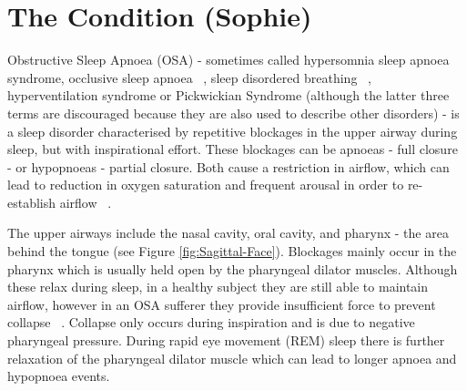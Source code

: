 \chapter{The Condition (Sophie)}
\label{ch:medicalInfo}
Obstructive Sleep Apnoea (OSA) - sometimes called hypersomnia sleep apnoea syndrome, occlusive sleep apnoea ~\cite{whitelaw1993characteristics}, sleep disordered breathing ~\cite{sleepdisorderedbreathing}, hyperventilation syndrome or Pickwickian Syndrome (although the latter three terms are discouraged because they are also used to describe other disorders)  - is a sleep disorder characterised by repetitive blockages in the upper airway during sleep, but with inspirational effort. These blockages can be apnoeas - full closure - or hypopnoeas  - partial closure. Both cause a restriction in airflow, which can lead to reduction in oxygen saturation and frequent arousal in order to re-establish airflow ~\cite{american2001international}.

The upper airways include the nasal cavity, oral cavity, and pharynx - the area behind the tongue (see Figure \ref{fig:Sagittal-Face}). Blockages mainly occur in the pharynx which is usually held open by the pharyngeal dilator muscles. Although these relax during sleep, in a healthy subject they are still able to maintain airflow, however in an OSA sufferer they provide insufficient force to prevent collapse ~\cite{fogel2004sleep}. Collapse only occurs during inspiration and is due to negative pharyngeal pressure. During rapid eye movement (REM) sleep there is further relaxation of the pharyngeal dilator muscle which can lead to longer apnoea and hypopnoea events. 


